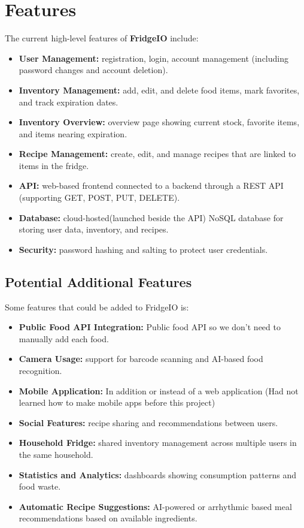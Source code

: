 \section{Features}

The current high-level features of \textbf{FridgeIO} include:

\begin{itemize}
    \item \textbf{User Management:} registration, login, account management (including password changes and account deletion).
    \item \textbf{Inventory Management:} add, edit, and delete food items, mark favorites, and track expiration dates.
    \item \textbf{Inventory Overview:} overview page showing current stock, favorite items, and items nearing expiration.
    \item \textbf{Recipe Management:} create, edit, and manage recipes that are linked to items in the fridge.
    \item \textbf{API:} web-based frontend connected to a backend through a REST API (supporting GET, POST, PUT, DELETE).
    \item \textbf{Database:} cloud-hosted(launched beside the API) NoSQL database for storing user data, inventory, and recipes.
    \item \textbf{Security:} password hashing and salting to protect user credentials.
\end{itemize}

\subsection{Potential Additional Features}

Some features that could be added to FridgeIO is:

\begin{itemize}
    \item \textbf{Public Food API Integration:} Public food API so we don't need to manually add each food.
    \item \textbf{Camera Usage:} support for barcode scanning and AI-based food recognition.
    \item \textbf{Mobile Application:} In addition or instead of a web application (Had not learned how to make mobile apps before this project)
    \item \textbf{Social Features:} recipe sharing and recommendations between users.
    \item \textbf{Household Fridge:} shared inventory management across multiple users in the same household.
    \item \textbf{Statistics and Analytics:} dashboards showing consumption patterns and food waste.
    \item \textbf{Automatic Recipe Suggestions:} AI-powered or arrhythmic based meal recommendations based on available ingredients.
\end{itemize}

